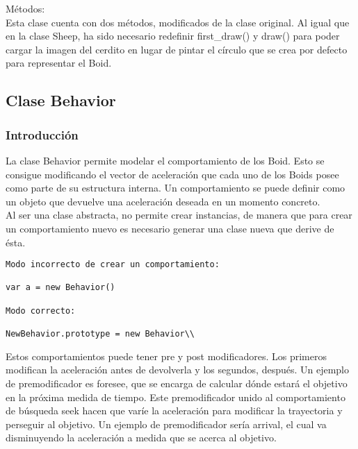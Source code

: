 Métodos:\\

Esta clase cuenta con dos métodos, modificados de la clase original. Al igual que en la clase Sheep, ha sido necesario redefinir 
first\_draw() y draw() para poder cargar la imagen del cerdito en lugar de pintar el círculo que se crea por defecto para representar el 
Boid.



\subsection{Clase Behavior}
\label{subsection:behavior_section}

\subsubsection{Introducción}
\label{subsubsection:behavior}

La clase Behavior permite modelar el comportamiento de los Boid. Esto se consigue modificando el vector de aceleración que cada uno de los 
Boids posee como parte de su estructura interna. Un comportamiento se puede definir como un objeto que devuelve una aceleración deseada en 
un momento concreto.\\

Al ser una clase abstracta, no permite crear instancias, de manera que para crear un comportamiento nuevo es necesario generar una clase 
nueva que derive de ésta.

\begin{verbatim}
Modo incorrecto de crear un comportamiento:

var a = new Behavior()

Modo correcto:

NewBehavior.prototype = new Behavior\\
\end{verbatim}

Estos comportamientos puede tener pre y post modificadores. Los primeros modifican la aceleración antes de devolverla y los segundos,
después. Un ejemplo de premodificador es foresee, que se encarga de calcular dónde estará el objetivo en la próxima medida de tiempo. Este 
premodificador unido al comportamiento de búsqueda seek hacen que varíe la aceleración para modificar la trayectoria y perseguir al objetivo. 
Un ejemplo de premodificador sería arrival, el cual va disminuyendo la aceleración a medida que se acerca al objetivo.\\

